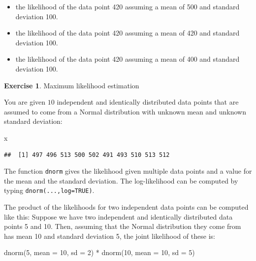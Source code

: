 \documentclass[
  12pt,
]{krantz}
\newenvironment{Shaded}{\begin{snugshade}}{\end{snugshade}}
\newcommand{\AttributeTok}[1]{\textcolor[rgb]{0.77,0.63,0.00}{#1}}
\newcommand{\DecValTok}[1]{\textcolor[rgb]{0.00,0.00,0.81}{#1}}
\newcommand{\FunctionTok}[1]{\textcolor[rgb]{0.00,0.00,0.00}{#1}}
\newcommand{\NormalTok}[1]{#1}
\newcommand{\SpecialCharTok}[1]{\textcolor[rgb]{0.00,0.00,0.00}{#1}}
\providecommand{\tightlist}{%
  \setlength{\itemsep}{0pt}\setlength{\parskip}{0pt}}
\theoremstyle{definition}
\theoremstyle{definition}
\theoremstyle{definition}
\newtheorem{exercise}{Exercise}[chapter]
\theoremstyle{definition}
\theoremstyle{remark}
\begin{document}
\begin{itemize}
\tightlist
\item
  the likelihood of the data point 420 assuming a mean of 500 and standard deviation 100.
\item
  the likelihood of the data point 420 assuming a mean of 420 and standard deviation 100.
\item
  the likelihood of the data point 420 assuming a mean of 400 and standard deviation 100.
\end{itemize}

\begin{exercise}
\protect\hypertarget{exr:Foundationsexercisesmle2}{}\label{exr:Foundationsexercisesmle2}Maximum likelihood estimation
\end{exercise}

You are given \(10\) independent and identically distributed data points that are assumed to come from a Normal distribution with unknown mean and unknown standard deviation:

\begin{Shaded}
\begin{Highlighting}[]
\NormalTok{x}
\end{Highlighting}
\end{Shaded}

\begin{verbatim}
##  [1] 497 496 513 500 502 491 493 510 513 512
\end{verbatim}

The function \texttt{dnorm} gives the likelihood given multiple data points and a value for the mean and the standard deviation. The log-likelihood can be computed by typing \texttt{dnorm(...,log=TRUE)}.

The product of the likelihoods for two independent data points can be computed like this: Suppose we have two independent and identically distributed data points 5 and 10. Then, assuming that the Normal distribution they come from has mean 10 and standard deviation 5, the joint likelihood of these is:

\begin{Shaded}
\begin{Highlighting}[]
\FunctionTok{dnorm}\NormalTok{(}\DecValTok{5}\NormalTok{, }\AttributeTok{mean =} \DecValTok{10}\NormalTok{, }\AttributeTok{sd =} \DecValTok{2}\NormalTok{) }\SpecialCharTok{*} \FunctionTok{dnorm}\NormalTok{(}\DecValTok{10}\NormalTok{, }\AttributeTok{mean =} \DecValTok{10}\NormalTok{, }\AttributeTok{sd =} \DecValTok{5}\NormalTok{)}
\end{Highlighting}
\end{Shaded}
\end{document}
